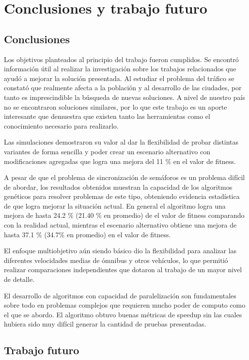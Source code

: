 \chapter{Conclusiones y trabajo futuro}

\section{Conclusiones}
Los objetivos planteados al principio del trabajo fueron cumplidos.
Se encontró información útil al realizar la investigación sobre los trabajos relacionados que ayudó a mejorar la solución presentada. 
Al estudiar el problema del tráfico se constató que realmente afecta a la población y al desarrollo de las ciudades, por tanto es imprescindible la búsqueda de nuevas soluciones. A nivel de nuestro país no se encontraron soluciones similares, por lo que este trabajo es un aporte interesante que demuestra que existen tanto las herramientas como el conocimiento necesario para realizarlo.
 
Las simulaciones demostraron su valor al dar la flexibilidad de probar distintas variantes de forma sencilla y poder crear un escenario alternativo con modificaciones agregadas que logra una mejora del 11 \% en el valor de fitness.
 
A pesar de que el problema de sincronización de semáforos es un problema difícil de abordar, los resultados obtenidos muestran la capacidad de los algoritmos genéticos para resolver problemas de este tipo, obteniendo evidencia estadística de que logra mejorar la situación actual. En general el algoritmo logra una mejora de hasta  24.2 \% (21.40 \% en promedio) de el valor de fitness comparando con la realidad actual, mientras el escenario alternativo obtiene una mejora de hasta 37.1 \% (34.7\% en promedio) en el valor de fitness.

El enfoque multiobjetivo aún siendo básico dio la flexibilidad para analizar las diferentes velocidades medias de ómnibus y otros vehículos, lo que permitió realizar comparaciones independientes que dotaron al trabajo de un mayor nivel de detalle.

El desarrollo de algoritmos con capacidad de paralelización son fundamentales sobre  todo en problemas complejos que requieren mucho poder de computo como el que se abordo. El algoritmo obtuvo buenas métricas de speedup sin las cuales hubiera sido muy difícil generar la cantidad de pruebas presentadas.

\section{Trabajo futuro}

